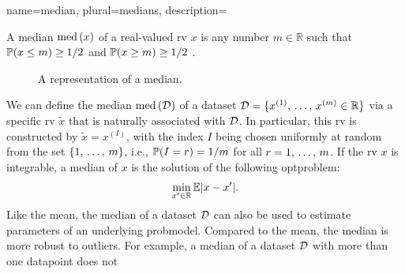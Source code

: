 {name={median}, 
plural={medians},
	description={A median $\mathrm{med}\,(x)$ of a real-valued \gls{rv} $x$ 
 		is any number $m \in \mathbb{R}$ such that $\mathbb{P}({ x \leq m}) \geq 1/2$ and $\mathbb{P}({ x \geq m}) \geq 1/2$ \cite{LC}. 
 		\begin{figure}[H]
			\begin{center}
			\end{center}
			\caption{A representation of a median.}
 		\end{figure}  
 		We can define the median $\mathrm{med}\,(\mathcal{D})$ 
 		of a \gls{dataset} $\mathcal{D} = \{ x^{(1)}, \,\ldots, \,x^{(m)} \in \mathbb{R} \}$ 
 		via a specific \gls{rv} $\tilde{x}$ that is naturally associated with $\mathcal{D}$. 
 		In particular, this \gls{rv} is constructed by $\tilde{x} = x^{(I)}$, with the index $I$ 
 		being chosen uniformly at random from the set $\{1, \,\ldots, \,m\}$, i.e., $\mathbb{P}({I = r})=1/m$ for 
 		all $r=1, \,\ldots, \,m$. If the \gls{rv} $x$ is integrable, a median of $x$ 
 		is the solution of the following \gls{optproblem}: 
 		$$\min_{x' \in \mathbb{R}} \mathbb{E}{|x - x'|}.$$ 
 		Like the \gls{mean}, the median of a \gls{dataset} $\mathcal{D}$ can also be used 
 		to estimate \glspl{parameter} of an underlying \gls{probmodel}. Compared 
 		to the \gls{mean}, the median is more robust to \glspl{outlier}. For example, 
 		a median of a \gls{dataset} $\mathcal{D}$ with more than one \gls{datapoint} does not 
}}

